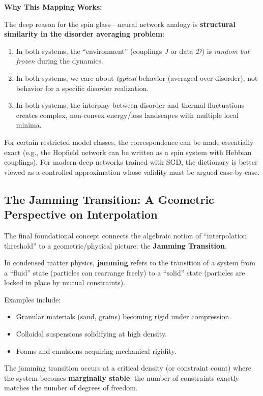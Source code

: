 \documentclass[
  journal=largetwo,
  simfonts=false,
  year=2025,
  volume=37,
]{cup-journal}
\begin{document}
\textbf{Why This Mapping Works:}

The deep reason for the spin glass---neural network analogy is \textbf{structural similarity in the disorder averaging problem}:
\begin{enumerate}
    \item In both systems, the ``environment'' (couplings $J$ or data $\mathcal{D}$) is \textit{random but frozen} during the dynamics.
    \item In both systems, we care about \textit{typical} behavior (averaged over disorder), not behavior for a specific disorder realization.
    \item In both systems, the interplay between disorder and thermal fluctuations creates complex, non-convex energy/loss landscapes with multiple local minima.
\end{enumerate}

For certain restricted model classes, the correspondence can be made essentially exact (e.g., the Hopfield network can be written as a spin system with Hebbian couplings). For modern deep networks trained with SGD, the dictionary is better viewed as a controlled approximation whose validity must be argued case-by-case.

\subsection{The Jamming Transition: A Geometric Perspective on Interpolation}

The final foundational concept connects the algebraic notion of ``interpolation threshold'' to a geometric/physical picture: the \textbf{Jamming Transition}.

\begin{definition}\label{def:jamming_physics}
In condensed matter physics, \textbf{jamming} refers to the transition of a system from a ``fluid'' state (particles can rearrange freely) to a ``solid'' state (particles are locked in place by mutual constraints).

Examples include:
\begin{itemize}
    \item Granular materials (sand, grains) becoming rigid under compression.
    \item Colloidal suspensions solidifying at high density.
    \item Foams and emulsions acquiring mechanical rigidity.
\end{itemize}

The jamming transition occurs at a critical density (or constraint count) where the system becomes \textbf{marginally stable}: the number of constraints exactly matches the number of degrees of freedom.
\end{definition}
\end{document}

